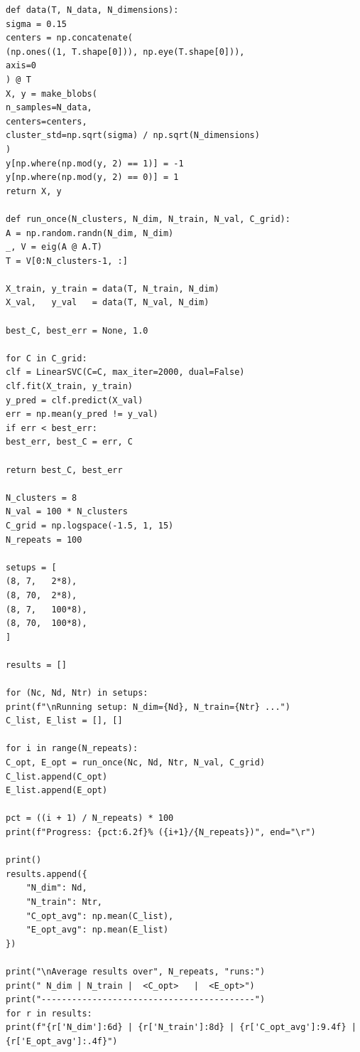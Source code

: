 \documentclass[11pt]{article}
\begin{document}
\begin{lstlisting}[style=matlabstyle,caption={Homework Code}]
def data(T, N_data, N_dimensions):
sigma = 0.15
centers = np.concatenate(
(np.ones((1, T.shape[0])), np.eye(T.shape[0])),
axis=0
) @ T
X, y = make_blobs(
n_samples=N_data,
centers=centers,
cluster_std=np.sqrt(sigma) / np.sqrt(N_dimensions)
)
y[np.where(np.mod(y, 2) == 1)] = -1
y[np.where(np.mod(y, 2) == 0)] = 1
return X, y

def run_once(N_clusters, N_dim, N_train, N_val, C_grid):
A = np.random.randn(N_dim, N_dim)
_, V = eig(A @ A.T)
T = V[0:N_clusters-1, :]

X_train, y_train = data(T, N_train, N_dim)
X_val,   y_val   = data(T, N_val, N_dim)

best_C, best_err = None, 1.0

for C in C_grid:
clf = LinearSVC(C=C, max_iter=2000, dual=False)
clf.fit(X_train, y_train)
y_pred = clf.predict(X_val)
err = np.mean(y_pred != y_val)
if err < best_err:
best_err, best_C = err, C

return best_C, best_err

N_clusters = 8
N_val = 100 * N_clusters
C_grid = np.logspace(-1.5, 1, 15)
N_repeats = 100

setups = [
(8, 7,   2*8),
(8, 70,  2*8),
(8, 7,   100*8),
(8, 70,  100*8),
]

results = []

for (Nc, Nd, Ntr) in setups:
print(f"\nRunning setup: N_dim={Nd}, N_train={Ntr} ...")
C_list, E_list = [], []

for i in range(N_repeats):
C_opt, E_opt = run_once(Nc, Nd, Ntr, N_val, C_grid)
C_list.append(C_opt)
E_list.append(E_opt)

pct = ((i + 1) / N_repeats) * 100
print(f"Progress: {pct:6.2f}% ({i+1}/{N_repeats})", end="\r")

print()
results.append({
	"N_dim": Nd,
	"N_train": Ntr,
	"C_opt_avg": np.mean(C_list),
	"E_opt_avg": np.mean(E_list)
})

print("\nAverage results over", N_repeats, "runs:")
print(" N_dim | N_train |  <C_opt>   |  <E_opt>")
print("------------------------------------------")
for r in results:
print(f"{r['N_dim']:6d} | {r['N_train']:8d} | {r['C_opt_avg']:9.4f} | {r['E_opt_avg']:.4f}")
	\end{lstlisting}
	
\end{document}
